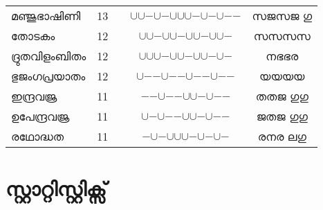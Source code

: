 \documentclass{article}
\newcommand{\La}{{$\cup$}}
\newcommand{\Gu}{{$\minus$}}
\newcommand{\Ya}{~{\color{red}\textbf{|}}~}
\newcommand{\Li}{~~~~{\color{red}\textbf{//}}~~~~}
\newcommand{\Yo}{{\color{blue}\textbf{|}}}
\newcommand{\Ivr}[1]{#1}
\begin{document}
{\begin{tabular}{|l|rc|c|c|}


\Ivr{മഞ്ജുഭാഷിണി} & 13 & & \La\La\Gu\La\Gu\La\La\La\Gu\La\Gu\La\Gu\Gu  & സജസജ ഗു\\



\Ivr{തോടകം} & 12 & & \La\La\Gu\La\La\Gu\La\La\Gu\La\La\Gu & സസസസ\\

\Ivr{ദ്രുതവിളംബിതം} & 12 & & \La\La\La\Gu\La\La\Gu\La\La\Gu\La\Gu  & നഭഭര\\

\Ivr{ഭുജംഗപ്രയാതം} & 12 & & \La\Gu\Gu\La\Gu\Gu\La\Gu\Gu\La\Gu\Gu  & യയയയ\\

\Ivr{ഇന്ദ്രവജ്ര} & 11 & & \Gu\Gu\La\Gu\Gu\La\La\Gu\La\Gu\Gu  & തതജ ഗുഗു\\

\Ivr{ഉപേന്ദ്രവജ്ര} & 11 & & \La\Gu\La\Gu\Gu\La\La\Gu\La\Gu\Gu  & ജതജ ഗുഗു\\

\Ivr{രഥോദ്ധത} & 11 & & \Gu\La\Gu\La\La\La\Gu\La\Gu\La\Gu  & രനര ലഗു\\








\hline
\end{tabular}
}


\clearpage
\section{സ്റ്റാറ്റിസ്റ്റിക്സ്}
\label{sec:Statistics}
\end{document}
